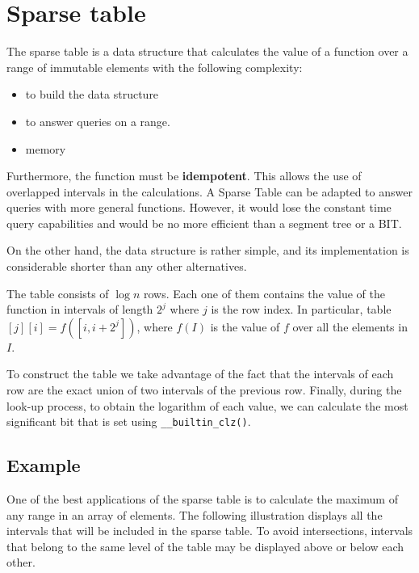 \newpage


\section{Sparse table}
The sparse table is a data structure that calculates the value of 
a function over a range of immutable elements with the following complexity:
\begin{itemize}
		\setlength{\itemsep}{2 pt}
		\item {} to build the data structure
		\item {} to answer queries on a range. 
		\item {} memory
\end{itemize}
Furthermore, the function must be \textbf{idempotent}. This allows the use of
overlapped intervals in the calculations. A Sparse Table can be adapted to 
answer queries with more general functions. However, it would lose the constant
time query capabilities and would be no more efficient than a segment tree or a BIT.


On the other hand, the data structure is rather simple, and its implementation 
is considerable shorter than any other alternatives. 

The table consists of $\log n$ rows. Each one of them contains the value of the
function in intervals of length $2^j$ where $j$ is the row index. In particular,
table$[j][i]=f([i,i+2^j])$, where $f(I)$ is the value of $f$ over all the 
elements in $I$.

To construct the table we take advantage of the fact that the intervals of each
row are the exact union of two intervals of the previous row. Finally,
during the look-up process, to obtain the 
logarithm of each value, we can calculate the most significant bit that is set 
using \texttt{__builtin_clz()}.

\newpage
\subsection{Example}
One of the best applications of the sparse table is to calculate the maximum of 
any range in an array of elements. The following illustration displays all the 
intervals that will be included in the sparse table. To avoid intersections, 
intervals that belong to the same level of the table may be displayed above 
or below each other.

